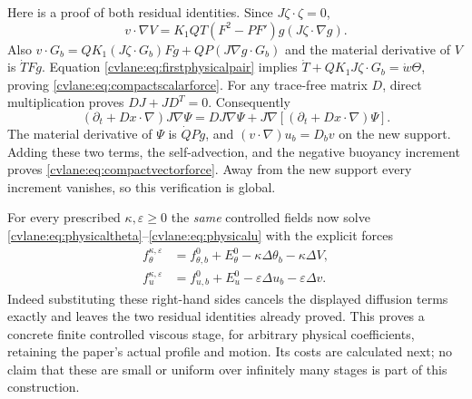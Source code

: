 Here is a proof of both residual identities. Since $J\zeta\cdot\zeta=0$,
\[
 v\cdot\nabla V=K_1QT(F^2-PF')g(J\zeta\cdot\nabla g).
\]
Also $v\cdot G_b=QK_1(J\zeta\cdot G_b)Fg+
 QP(J\nabla g\cdot G_b)$ and the material derivative of $V$ is
$\dot T Fg$. Equation \eqref{cvlane:eq:firstphysicalpair} implies
$\dot T+QK_1J\zeta\cdot G_b=\dot w\Theta$, proving
\eqref{cvlane:eq:compactscalarforce}. For any trace-free matrix $D$,
direct multiplication proves $DJ+JD^T=0$. Consequently
\[
 (\partial_t+Dx\cdot\nabla)J\nabla\Psi
 =D J\nabla\Psi+J\nabla[(\partial_t+Dx\cdot\nabla)\Psi].
\]
The material derivative of $\Psi$ is $\dot QPg$, and
$(v\cdot\nabla)u_b=D_bv$ on the new support. Adding these two
terms, the self-advection, and the negative buoyancy increment
proves \eqref{cvlane:eq:compactvectorforce}. Away from the new support
every increment vanishes, so this verification is global.

For every prescribed $\kappa,\varepsilon\geq0$ the \emph{same}
controlled fields now solve \eqref{cvlane:eq:physicaltheta}--\eqref{cvlane:eq:physicalu}
with the explicit forces
\begin{align}
 f_\theta^{\kappa,\varepsilon}
 &=f^0_{\theta,b}+E^0_\theta-\kappa\Delta\theta_b-\kappa\Delta V,
 \label{cvlane:eq:exactviscforce}\\
 f_u^{\kappa,\varepsilon}
 &=f^0_{u,b}+E^0_u-\varepsilon\Delta u_b-\varepsilon\Delta v.
 \label{cvlane:eq:exactviscu}
\end{align}
Indeed substituting these right-hand sides cancels the displayed
diffusion terms exactly and leaves the two residual identities
already proved. This proves a concrete finite controlled viscous
stage, for arbitrary physical coefficients, retaining the paper's
actual profile and motion. Its costs are calculated next; no
claim that these are small or uniform over infinitely many stages
is part of this construction.

